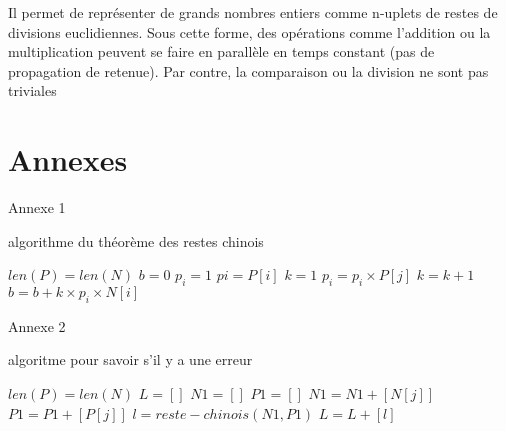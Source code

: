 \documentclass[a4paper, 11pt]{report}
\begin{document}
Il permet de représenter de grands nombres entiers comme n-uplets de restes de divisions euclidiennes.
Sous cette forme, des opérations comme l'addition ou la multiplication peuvent se faire en parallèle en temps constant 
(pas de propagation de retenue). Par contre, la comparaison ou la division ne sont pas triviales 

\chapter*{Annexes}
\begin{appendices}
    Annexe 1
    \begin{algorithm}
        \caption{algorithme du théorème des restes chinois}
        \begin{algorithmic}
            \REQUIRE $len(P)=len(N)$
            \STATE $b=0$
            \STATE $p_i=1$
            \STATE $pi=P[i]$
            \STATE $k=1$
            \STATE $p_i=p_i\times P[j]$
            \ENDIF
            \ENDFOR
            \STATE $k=k+1$
            \ENDWHILE
            \STATE $b=b+k\times p_i \times N[i] $
            \ENDFOR
        \end{algorithmic}
    \end{algorithm}
\end{appendices}

\newpage

\begin{appendices}
    Annexe 2
    \begin{algorithm}
        \caption{algoritme pour savoir s'il y a une erreur}
        \begin{algorithmic}
            \REQUIRE $len(P)=len(N)$
            \STATE $L=[]$
            \STATE $N1=[]$
            \STATE $P1=[]$
            \STATE $N1=N1+[N[j]]$
            \STATE $P1=P1+[P[j]]$
            \ENDIF
            \ENDFOR
            \STATE $l=reste-chinois(N1,P1)$
            \STATE $L=L+[l]$
            \ENDFOR
        \end{algorithmic}
    \end{algorithm}
\end{appendices}

\newpage
\end{document}
